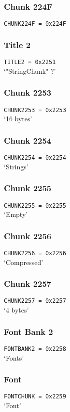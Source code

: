 \documentclass{article}
\begin{document}
\subsubsection{Chunk 224F}
\verb|CHUNK224F = 0x224F|

\subsubsection{Title 2}
\verb|TITLE2 = 0x2251|
\\
`"StringChunk" ?'

\subsubsection{Chunk 2253}
\verb|CHUNK2253 = 0x2253|
\\
`16 bytes'

\subsubsection{Chunk 2254}
\verb|CHUNK2254 = 0x2254|
\\
`Strings'

\subsubsection{Chunk 2255}
\verb|CHUNK2255 = 0x2255|
\\
`Empty'

\subsubsection{Chunk 2256}
\verb|CHUNK2256 = 0x2256|
\\
`Compressed'

\subsubsection{Chunk 2257}
\verb|CHUNK2257 = 0x2257|
\\
`4 bytes'

\subsubsection{Font Bank 2}
\verb|FONTBANK2 = 0x2258|
\\
`Fonts'

\subsubsection{Font}
\verb|FONTCHUNK = 0x2259|
\\
`Font'
\end{document}
